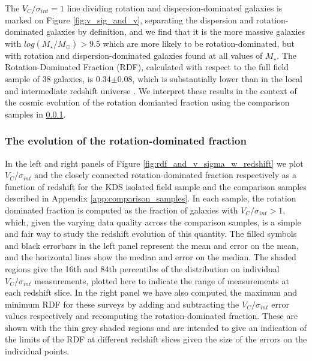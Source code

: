 \documentclass[fleqn,usenatbib]{mnras}
\begin{document}
\noindent
The $V_{C}$/$\sigma_{int}=1$ line dividing rotation and dispersion-dominated galaxies is marked on Figure \ref{fig:v_sig_and_v}, separating the dispersion and rotation-dominated galaxies by definition, and we find that it is the more massive galaxies with $log(M_{\star}/M_{\odot}) > 9.5$ which are more likely to be rotation-dominated, but with rotation and dispersion-dominated galaxies found at all values of $M_{\star}$.
The Rotation-Dominated Fraction (RDF), calculated with respect to the full field sample of 38 galaxies, is 0.34$\pm0.08$, which is substantially lower than in the local and intermediate redshift universe \citep[e.g.][]{Epinat2008a,Epinat2008,Green2014}.
We interpret these results in the context of the cosmic evolution of the rotation domianted fraction using the comparison samples in \cref{subsubsec:RDF_evolution}.\\

\subsubsection{The evolution of the rotation-dominated fraction}\label{subsubsec:RDF_evolution}

In the left and right panels of Figure \ref{fig:rdf_and_v_sigma_w_redshift} we plot $V_{C}/\sigma_{int}$ and the closely connected rotation-dominated fraction respectively as a function of redshift for the KDS isolated field sample and the comparison samples described in Appendix \ref{app:comparison_samples}.
In each sample, the rotation dominated fraction is computed as the fraction of galaxies with $V_{C}/\sigma_{int} > 1$, which, given the varying data quality across the comparison samples, is a simple and fair way to study the redshift evolution of this quantity. 
The filled symbols and black errorbars in the left panel represent the mean and error on the mean, and the horizontal lines show the median and error on the median.
The shaded regions give the 16th and 84th percentiles of the distribution on individual $V_{C}/\sigma_{int}$ measurements, plotted here to indicate the range of measurements at each redshift slice.
In the right panel we have also computed the maximum and minimum RDF for these surveys by adding and subtracting the $V_{C}/\sigma_{int}$ error values respectively and recomputing the rotation-dominated fraction.
These are shown with the thin grey shaded regions and are intended to give an indication of the limits of the RDF at different redshift slices given the size of the errors on the individual points.\\
\end{document}
